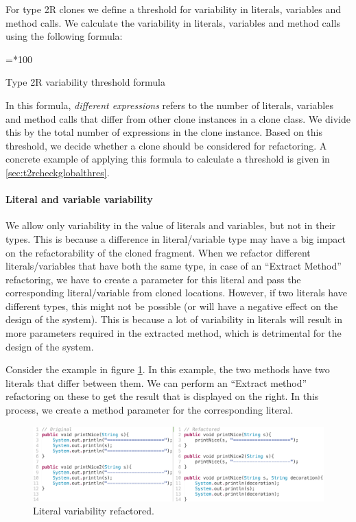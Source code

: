 For type 2R clones we define a threshold for variability in literals, variables and method calls. We calculate the variability in literals, variables and method calls using the following formula:

\begin{eqfloat}\label{eq:type2r}
=*100
\caption{Type 2R variability threshold formula}\end{eqfloat}

In this formula, \textit{different expressions} refers to the number of literals, variables and method calls that differ from other clone instances in a clone class. We divide this by the total number of expressions in the clone instance. Based on this threshold, we decide whether a clone should be considered for refactoring. A concrete example of applying this formula to calculate a threshold is given in \ref{sec:t2rcheckglobalthres}.

\paragraph{Literal and variable variability}\label{sec:t2rliteralandvariable}
We allow only variability in the value of literals and variables, but not in their types. This is because a difference in literal/variable type may have a big impact on the refactorability of the cloned fragment. When we refactor different literals/variables that have both the same type, in case of an ``Extract Method'' refactoring, we have to create a parameter for this literal and pass the corresponding literal/variable from cloned locations. However, if two literals have different types, this might not be possible (or will have a negative effect on the design of the system). This is because a lot of variability in literals will result in more parameters required in the extracted method, which is detrimental for the design of the system.

Consider the example in figure \ref{fig:type2literal}. In this example, the two methods have two literals that differ between them. We can perform an ``Extract method'' refactoring on these to get the result that is displayed on the right. In this process, we create a method parameter for the corresponding literal.

\begin{figure}[H]
  \centering
  \includegraphics[width=1\columnwidth]{img/type2literal}
  \caption{Literal variability refactored.}
  \label{fig:type2literal}
\end{figure}


